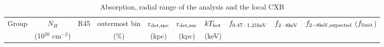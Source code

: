 \documentclass{aastex}
\begin{document}
\begin{table}
\begin{center}
\caption{Absorption, radial range of the analysis and the local CXB}
{\tiny
\begin{tabular}{cccccccccc} \hline \hline
Group & $N_{H}$\tablenotemark{a} & R45\tablenotemark{b} & outermost bin\tablenotemark{c} & r$_{\rm det, spe}$\tablenotemark{d} & r$_{\rm det, sur}$\tablenotemark{e} & $kT_{\rm hot}$\tablenotemark{f} & $f_{\rm 0.47 - 1.21 keV}$\tablenotemark{g} & $f_{\rm 2 - 8 keV}$\tablenotemark{h} & $f_{\rm 2 - 8 keV, expected}$ ($f_{\rm limit}$)\tablenotemark{i} \\
      & (10$^{20}$ cm$^{-2}$) & & (\%) & (kpc) & (kpc) & (keV) &  & & \\ \hline


\end{tabular}}
\end{center}
\end{table}
\end{document}
